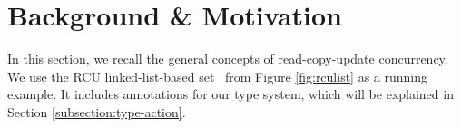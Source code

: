 \section{Background \& Motivation}
In this section, we recall the general concepts of read-copy-update concurrency.
We use the RCU linked-list-based set~\cite{McKenney2015SomeEO} from Figure \ref{fig:rculist} as a running example.  It includes annotations for our type system, which will be explained in Section \ref{subsection:type-action}.
\begin{comment}
  \begin{lstlisting}[basicstyle=\tiny]
    member & 
int member(int toRead){
ReadBegin;
int result;
BagNode<rcuItr> parent;
parent = head;
BagNode<rcuItr> current;
current = parent.Next;
while(current.data != toRead){
  parent = current;
  current= parent.Next;
}
result = current.data;
ReadEnd;
return result;
}
\end{lstlisting}&
  
  \end{comment}
